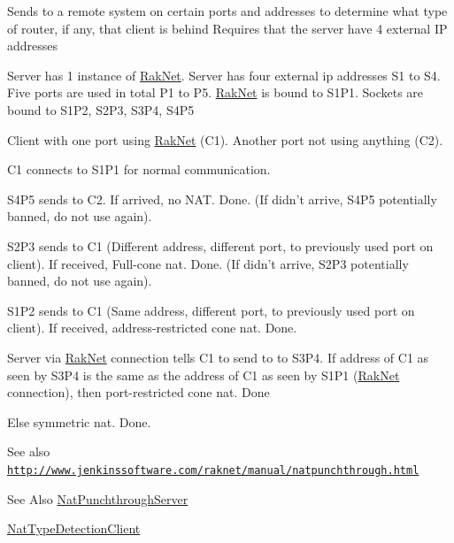 Sends to a remote system on certain ports and addresses to determine what type of router, if any, that client is behind Requires that the server have 4 external I\-P addresses 
\begin{DoxyEnumerate}
\item Server has 1 instance of \hyperlink{namespace_rak_net}{Rak\-Net}. Server has four external ip addresses S1 to S4. Five ports are used in total P1 to P5. \hyperlink{namespace_rak_net}{Rak\-Net} is bound to S1\-P1. Sockets are bound to S1\-P2, S2\-P3, S3\-P4, S4\-P5 
\item Client with one port using \hyperlink{namespace_rak_net}{Rak\-Net} (C1). Another port not using anything (C2). 
\item C1 connects to S1\-P1 for normal communication. 
\item S4\-P5 sends to C2. If arrived, no N\-A\-T. Done. (If didn't arrive, S4\-P5 potentially banned, do not use again). 
\item S2\-P3 sends to C1 (Different address, different port, to previously used port on client). If received, Full-\/cone nat. Done. (If didn't arrive, S2\-P3 potentially banned, do not use again). 
\item S1\-P2 sends to C1 (Same address, different port, to previously used port on client). If received, address-\/restricted cone nat. Done. 
\item Server via \hyperlink{namespace_rak_net}{Rak\-Net} connection tells C1 to send to to S3\-P4. If address of C1 as seen by S3\-P4 is the same as the address of C1 as seen by S1\-P1 (\hyperlink{namespace_rak_net}{Rak\-Net} connection), then port-\/restricted cone nat. Done 
\item Else symmetric nat. Done. 
\end{DoxyEnumerate}See also \href{http://www.jenkinssoftware.com/raknet/manual/natpunchthrough.html}{\tt http\-://www.\-jenkinssoftware.\-com/raknet/manual/natpunchthrough.\-html} \begin{DoxySeeAlso}{See Also}
\hyperlink{class_rak_net_1_1_nat_punchthrough_server}{Nat\-Punchthrough\-Server} 

\hyperlink{class_rak_net_1_1_nat_type_detection_client}{Nat\-Type\-Detection\-Client} 
\end{DoxySeeAlso}



